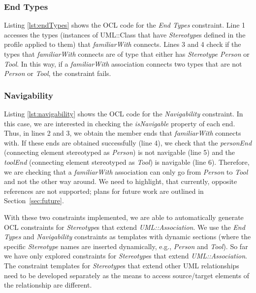 \subsubsection{End Types}
Listing \ref{lst:endTypes} shows the OCL code for the \emph{End Types} constraint. 
Line 1 accesses the types (instances of UML::Class that have \textit{Stereotype}s defined in the profile applied to them) that \emph{familiarWith} connects. 
Lines 3 and 4 check if the types that \emph{familiarWith} connects are of type that either has \textit{Stereotype} \emph{Person} or \emph{Tool}. 
In this way, if a \emph{familiarWith} association connects two types that are not \emph{Person} or \emph{Tool}, the constraint fails.



\subsubsection{Navigability}
Listing \ref{lst:navigability} shows the OCL code for the \emph{Navigability} constraint. 
In this case, we are interested in checking the \emph{isNavigable} property of each end. 
Thus, in lines 2 and 3, we obtain the member ends that \emph{familiarWith} connects with. 
If these ends are obtained successfully (line 4), we check that the \emph{personEnd} (connecting element stereotyped as \emph{Person}) is not navigable (line 5) and the \emph{toolEnd} (connecting element stereotyped as \emph{Tool}) is navigable (line 6). 
Therefore, we are checking that a \emph{familiarWith} association can only go from \emph{Person} to \emph{Tool} and not the other way around. 
We need to highlight, that currently, opposite references are not supported; plans for future work are outlined in Section~\ref{sec:future}.

\begin{figure}[h]
	
\end{figure}

With these two constraints implemented, we are able to automatically generate OCL constraints for \textit{Stereotype}s that extend \emph{UML::Association}. 
We use the \emph{End Types} and \emph{Navigability} constraints as templates with dynamic sections (where the specific \textit{Stereotype} names are inserted dynamically, e.g., \emph{Person} and \emph{Tool}). 
So far we have only explored constraints for \textit{Stereotype}s that extend \emph{UML::Association}. 
The constraint templates for \textit{Stereotype}s that extend other UML relationships need to be developed separately as the means to access source/target elements of the relationship are different.

